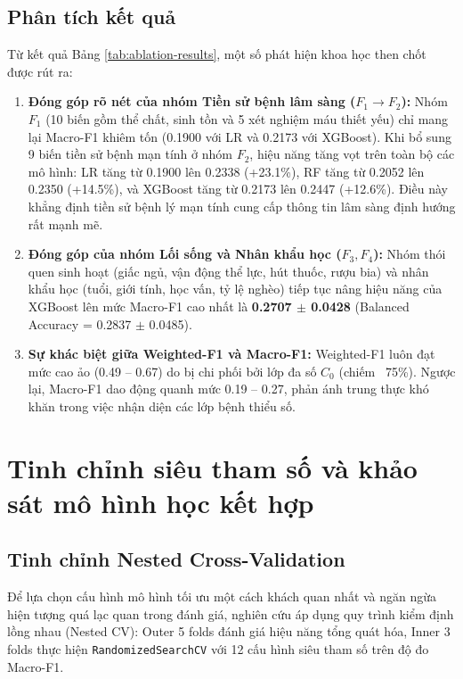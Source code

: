 \subsection{Phân tích kết quả}
Từ kết quả Bảng \ref{tab:ablation-results}, một số phát hiện khoa học then chốt được rút ra:
\begin{enumerate}
    \item \textbf{Đóng góp rõ nét của nhóm Tiền sử bệnh lâm sàng ($F_1 \to F_2$):} Nhóm $F_1$ (10 biến gồm thể chất, sinh tồn và 5 xét nghiệm máu thiết yếu) chỉ mang lại Macro-F1 khiêm tốn (0.1900 với LR và 0.2173 với XGBoost). Khi bổ sung 9 biến tiền sử bệnh mạn tính ở nhóm $F_2$, hiệu năng tăng vọt trên toàn bộ các mô hình: LR tăng từ 0.1900 lên 0.2338 (+23.1\%), RF tăng từ 0.2052 lên 0.2350 (+14.5\%), và XGBoost tăng từ 0.2173 lên 0.2447 (+12.6\%). Điều này khẳng định tiền sử bệnh lý mạn tính cung cấp thông tin lâm sàng định hướng rất mạnh mẽ.
    \item \textbf{Đóng góp của nhóm Lối sống và Nhân khẩu học ($F_3, F_4$):} Nhóm thói quen sinh hoạt (giấc ngủ, vận động thể lực, hút thuốc, rượu bia) và nhân khẩu học (tuổi, giới tính, học vấn, tỷ lệ nghèo) tiếp tục nâng hiệu năng của XGBoost lên mức Macro-F1 cao nhất là \textbf{0.2707 $\pm$ 0.0428} (Balanced Accuracy = 0.2837 $\pm$ 0.0485).
    \item \textbf{Sự khác biệt giữa Weighted-F1 và Macro-F1:} Weighted-F1 luôn đạt mức cao ảo (0.49 -- 0.67) do bị chi phối bởi lớp đa số $C_0$ (chiếm ~75\%). Ngược lại, Macro-F1 dao động quanh mức 0.19 -- 0.27, phản ánh trung thực khó khăn trong việc nhận diện các lớp bệnh thiểu số.
\end{enumerate}

\section{Tinh chỉnh siêu tham số và khảo sát mô hình học kết hợp}
\label{sec:tuning-va-ensemble}

\subsection{Tinh chỉnh Nested Cross-Validation}
Để lựa chọn cấu hình mô hình tối ưu một cách khách quan nhất và ngăn ngừa hiện tượng quá lạc quan trong đánh giá, nghiên cứu áp dụng quy trình kiểm định lồng nhau (Nested CV): Outer 5 folds đánh giá hiệu năng tổng quát hóa, Inner 3 folds thực hiện \texttt{RandomizedSearchCV} với 12 cấu hình siêu tham số trên độ đo Macro-F1.

